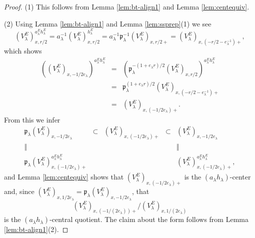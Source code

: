 \documentclass{article}
\def\mf#1{\mathfrak{#1}}
\theoremstyle{definition}
\numberwithin{equation}{subsection}
\renewcommand{\-}{\hyp{}}
\begin{document}
\begin{proof}
	(1) This follows from Lemma \ref{lem:bt-align1} and Lemma \ref{lem:centequiv}.
	
	(2) Using Lemma \ref{lem:bt-align1} and Lemma \ref{lem:ssprep}(1) we see
	\[ (V_\lambda^E)_{x,r/2}^{a_\lambda^E h_\lambda^E} = a_\lambda^{-1} (V_\lambda^E)_{x,r/2}^{h_\lambda^E} = a_\lambda^{-1} \mf{p}_\lambda^{-1}(V_\lambda^E)_{x,r/2+} = (V_\lambda^E)_{x,(-r/2-e_\lambda^{-1})+}, \]
	which shows
	\begin{eqnarray*}
	((V_\lambda^E)_{x,-1/2e_\lambda})^{a_\lambda^E h_\lambda^E} &=& (\mf{p}_\lambda^{-(1+e_\lambda r)/2}(V_\lambda^E)_{x,r/2})^{a_\lambda^E h_\lambda^E}\\
	& =& \mf{p}_\lambda^{(1+e_\lambda r)/2} (V_\lambda^E)_{x,(-r/2-e_\lambda^{-1})+}	\\
	&=&(V_\lambda^E)_{x,(-1/2e_\lambda)+}.
	\end{eqnarray*}
	From this we infer 
	\[ \begin{array}{ccccc}
	 \mf{p}_\lambda (V_\lambda^E)_{x,-1/2e_\lambda} &\subset& (V_\lambda^E)_{x,(-1/2e_\lambda)+}& \subset& (V_\lambda^E)_{x,-1/2e_\lambda}\\
	 \Vert&&&&\Vert\\
	 \mf{p}_\lambda (V_\lambda^E)_{x,(-1/2e_\lambda)+}^{a_\lambda^E h_\lambda^E} &&&& (V_\lambda^E)_{x,(-1/2e_\lambda)+}^{a_\lambda^E h_\lambda^E},
	\end{array} \]
	and Lemma \ref{lem:centequiv} shows that $(V_\lambda^E)_{x,(-1/2e_\lambda)+}$ is the $(a_\lambda h_\lambda)$-center and, since $(V_\lambda^E)_{x,1/2e_\lambda}=\mf{p}_\lambda (V_\lambda^E)_{x,-1/2e_\lambda}$, that
	\[ (V_\lambda^E)_{x,(-1/(2e_\lambda))+}/(V_\lambda^E)_{x,1/(2e_\lambda)} \]
	is the $(a_\lambda h_\lambda)$-central quotient. The claim about the form follows from Lemma \ref{lem:bt-align1}(2). 



\end{proof}
\end{document}
